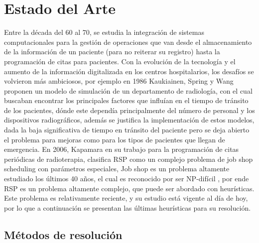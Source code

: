 \documentclass[letter, 10pt]{article}
\begin{document}
\section{Estado del Arte}
Entre la década del 60 al 70, se estudia la integración de sistemas computacionales para la gestión de operaciones\cite{uno} que van desde el almacenamiento de la información de un paciente (para no reiterar su registro) hasta la programación de citas para pacientes. Con la evolución de la tecnología y el aumento de la información digitalizada en los centros hospitalarios, los desafíos se volvieron más ambiciosos, por ejemplo en 1986 Kaukiainen, Spring y Wang \cite{dos} proponen un modelo de simulación de un departamento de radiología, con el cual buscaban encontrar los principales factores que influían en el tiempo de tránsito de los pacientes, dónde este dependía principalmente del número de personal y los dispositivos radiográficos, además se justifica la implementación de estos modelos, dada la baja significativa de tiempo en tránsito del paciente pero se deja abierto el problema para mejoras como para los tipos de pacientes que llegan de emergencia. En 2006, Kapamara \cite{tres} en su trabajo para la programación de citas periódicas de radioterapia, clasifica RSP como un complejo problema de job shop scheduling con parámetros especiales, Job shop es un problema altamente estudiado los últimos 40 años, el cual es reconocido por ser NP-difícil \cite{cuatro}, por ende RSP es un problema altamente complejo, que puede ser abordado con heurísticas. 
\\
Este problema es relativamente reciente, y su estudio está vigente al día de hoy, por lo que a continuación se presentan las últimas heurísticas para su resolución.

\subsection{Métodos de resolución}
\end{document}

